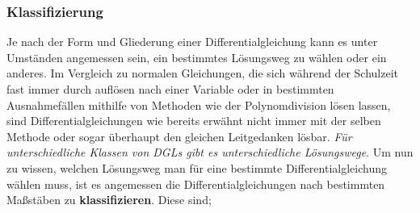 \documentclass[a4paper,11pt]{article}
\theoremstyle{remark}
\begin{document}
\subsubsection{Klassifizierung}
Je nach der Form und Gliederung einer Differentialgleichung kann es unter Umständen angemessen sein, ein bestimmtes Lösungsweg zu wählen oder ein anderes. Im Vergleich zu normalen Gleichungen, die sich während der Schulzeit fast immer durch auflösen nach einer Variable oder in bestimmten Ausnahmefällen mithilfe von Methoden wie der Polynomdivision lösen lassen, sind Differentialgleichungen wie bereits erwähnt nicht immer mit der selben Methode oder sogar überhaupt den gleichen Leitgedanken lösbar. \textit{Für unterschiedliche Klassen von DGLs gibt es unterschiedliche Lösungswege}. Um nun zu wissen, welchen Lösungsweg man für eine bestimmte Differentialgleichung wählen muss, ist es angemessen die Differentialgleichungen nach bestimmten Maßstäben zu \textbf{klassifizieren}. Diese sind;
\end{document}
